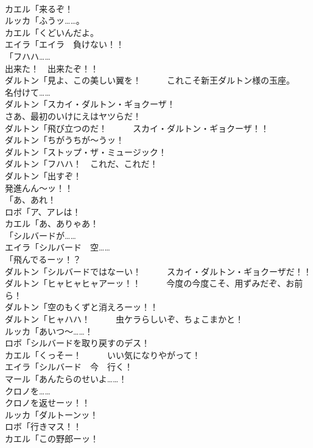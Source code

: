 \documentclass[8pt]{extreport}
\begin{document}
\begin{CJK}{UTF8}{min}
\\	カエル「来るぞ！	
\\	ルッカ「ふうッ……。	
\\	カエル「くどいんだよ。	
\\	エイラ「エイラ　負けない！！	
\\	「フハハ……	
\\	出来た！　出来たぞ！！	
\\	ダルトン「見よ、この美しい翼を！　　　これこそ新王ダルトン様の玉座。　　　名付けて……	
\\	ダルトン「スカイ・ダルトン・ギョクーザ！	
\\	さあ、最初のいけにえはヤツらだ！	
\\	ダルトン「飛び立つのだ！　　　スカイ・ダルトン・ギョクーザ！！	
\\	ダルトン「ちがうちが～うッ！	
\\	ダルトン「ストップ・ザ・ミュージック！	
\\	ダルトン「フハハ！　これだ、これだ！	
\\	ダルトン「出すぞ！	
\\	発進んん～ッ！！	
\\	「あ、あれ！	
\\	ロボ「ア、アレは！	
\\	カエル「あ、ありゃあ！	
\\	「シルバードが……	
\\	エイラ「シルバード　空……	
\\	「飛んでるーッ！？	
\\	ダルトン「シルバードではなーい！　　　スカイ・ダルトン・ギョクーザだ！！	
\\	ダルトン「ヒャヒャヒャアーッ！！　　　今度の今度こそ、用ずみだぞ、お前ら！	
\\	ダルトン「空のもくずと消えろーッ！！	
\\	ダルトン「ヒャハハ！　　　虫ケラらしいぞ、ちょこまかと！	
\\	ルッカ「あいつ～……！	
\\	ロボ「シルバードを取り戻すのデス！	
\\	カエル「くっそー！　　　いい気になりやがって！	
\\	エイラ「シルバード　今　行く！	
\\	マール「あんたらのせいよ……！	
\\	クロノを……	
\\	クロノを返せーッ！！	
\\	ルッカ「ダルトーンッ！	
\\	ロボ「行きマス！！	
\\	カエル「この野郎ーッ！	

\end{CJK}
\end{document}
